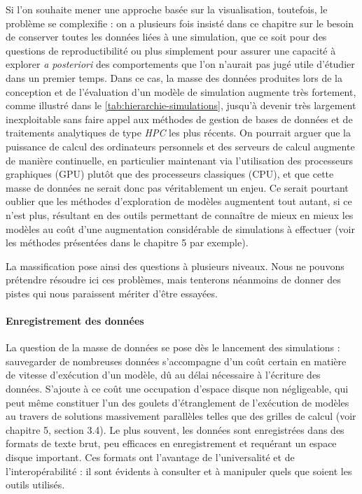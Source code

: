 \documentclass[a4paper, 12pt]{article}
\begin{document}
Si l'on souhaite mener une approche basée sur la visualisation, toutefois, le problème se complexifie : on a plusieurs fois insisté dans ce chapitre sur le besoin de conserver toutes les données liées à une simulation, que ce soit pour des questions de reproductibilité ou plus simplement pour assurer une capacité à explorer \textit{a posteriori} des comportements que l'on n'aurait pas jugé utile d'étudier dans un premier temps.
Dans ce cas, la masse des données produites lors de la conception et de l'évaluation d'un modèle de simulation augmente très fortement, comme illustré dans le \cref{tab:hierarchie-simulations}, jusqu'à devenir très largement inexploitable sans faire appel aux méthodes de gestion de bases de données et de traitements analytiques de type \og \textit{HPC} \fg{} les plus récents.
On pourrait arguer que la puissance de calcul des ordinateurs personnels et des serveurs de calcul augmente de manière continuelle, en particulier maintenant via l'utilisation des processeurs graphiques (GPU) plutôt que des processeurs classiques (CPU), et que cette masse de données ne serait donc pas véritablement un enjeu.
Ce serait pourtant oublier que les méthodes d'exploration de modèles augmentent tout autant, si ce n'est plus, résultant en des outils permettant de connaître de mieux en mieux les modèles au coût d'une augmentation considérable de simulations à effectuer (voir les méthodes présentées dans le chapitre 5 par exemple).

La massification pose ainsi des questions à plusieurs niveaux.
Nous ne pouvons prétendre résoudre ici ces problèmes, mais tenterons néanmoins de donner des pistes qui nous paraissent mériter d'être essayées.

\paragraph{Enregistrement des données}
La question de la masse de données se pose dès le lancement des simulations : sauvegarder de nombreuses données s'accompagne d'un coût certain en matière de vitesse d'exécution d'un modèle, dû	au délai nécessaire à l'écriture des données.
S'ajoute à ce coût une occupation d'espace disque non négligeable, qui peut même constituer l'un des goulets d'étranglement de l'exécution de modèles au travers de solutions massivement parallèles telles que des grilles de calcul (voir chapitre 5, section 3.4).
Le plus souvent, les données sont enregistrées dans des formats de texte brut, peu efficaces en enregistrement et requérant un espace disque important.
Ces formats ont l'avantage de l'universalité et de l'interopérabilité : il sont évidents à consulter et à manipuler quels que soient les outils utilisés.
\end{document}
